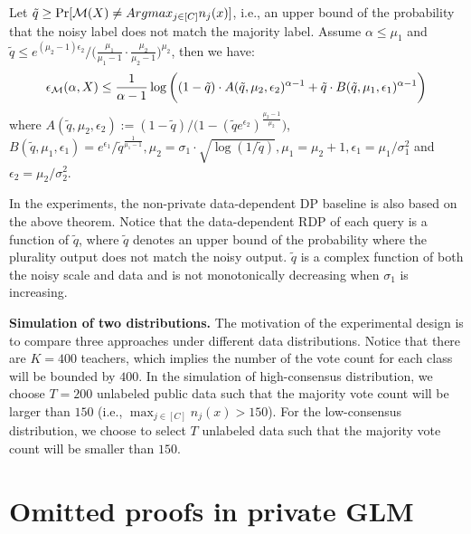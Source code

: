 \begin{theorem}
 Let $\tilde{q}\geq \mathrm{Pr}[\mathcal{M}(X)\neq Argmax_{j\in [C]} n_j(x)]$, i.e., an upper bound of the probability that the noisy label does not match the majority label. Assume $\alpha\leq \mu_1$ and $\tilde{q}\leq e^{(\mu_2 -1)\epsilon_2}/\bigg(\frac{\mu_1}{\mu_1 -1} \cdot \frac{\mu_2}{\mu_2 -1}\bigg)^{\mu_2}$, then we have:
 \[\epsilon_{\mathcal{M}}(\alpha, X) \leq \frac{1}{\alpha-1}\log \bigg( (1-\tilde{q})\cdot A(\tilde{q}, \mu_2, \epsilon_2)^{\alpha-1} +\tilde{q}\cdot B(\tilde{q}, \mu_1, \epsilon_1)^{\alpha-1}\bigg)  \]
 where $A(\tilde{q}, \mu_2, \epsilon_2):= (1-\tilde{q})/\bigg(1-(\tilde{q}e^{\epsilon_2})^{\frac{\mu_2-1}{\mu_2}}\bigg)$, $B(\tilde{q},\mu_1, \epsilon_1)=e^{\epsilon_1}/\tilde{q}^{\frac{1}{\mu_1 -1}}, \mu_2=\sigma_1 \cdot \sqrt{\log(1/\tilde{q})}, \mu_1 = \mu_2 +1, \epsilon_1 = \mu_1/\sigma_1^2 $ and $\epsilon_2 = \mu_2/\sigma_2^2$.
    
\end{theorem}
 
In the experiments, the non-private data-dependent DP baseline is also based on the above theorem.  Notice that the data-dependent RDP of each query is a function of $\tilde{q}$, where $\tilde{q}$ denotes an upper bound of the probability where the plurality output does not match the noisy output. $\tilde{q}$ is a complex function of both the noisy scale and data and is not monotonically decreasing when $\sigma_1$ is increasing.  


\textbf{Simulation of two distributions.}
The motivation of the experimental design is to compare three approaches under different data distributions. 
Notice that there are $K=400$ teachers, which implies the number of the vote count for each class will be bounded by $400$. In the simulation of high-consensus distribution, we choose $T=200$ unlabeled public data such that the majority vote count will be larger than $150$ (i.e., $\max_{j\in[C]} n_j(x)>150$). For the low-consensus distribution, we choose to select $T$ unlabeled data such that the majority vote count will be smaller than $150$.





\section{Omitted proofs in private GLM}
